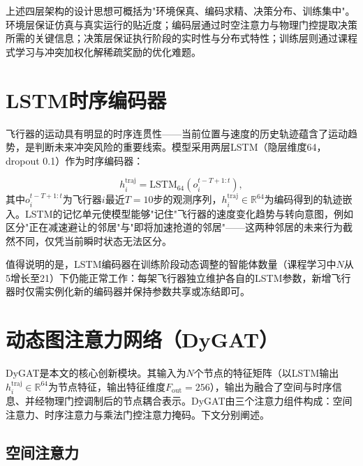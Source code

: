 \documentclass[12pt,a4paper,UTF8]{ctexbook}
\begin{document}
上述四层架构的设计思想可概括为"环境保真、编码求精、决策分布、训练集中"。环境层保证仿真与真实运行的贴近度；编码层通过时空注意力与物理门控提取决策所需的关键信息；决策层保证执行阶段的实时性与分布式特性；训练层则通过课程式学习与冲突加权化解稀疏奖励的优化难题。

\section{LSTM时序编码器}

飞行器的运动具有明显的时序连贯性——当前位置与速度的历史轨迹蕴含了运动趋势，是判断未来冲突风险的重要线索。模型采用两层LSTM（隐层维度64，dropout 0.1）作为时序编码器：

\begin{equation}
    h_i^{\text{traj}} = \text{LSTM}_{64}(o_i^{t-T+1:t}),
    \label{eq:lstm}
\end{equation}
其中$o_i^{t-T+1:t}$为飞行器$i$最近$T=10$步的观测序列，$h_i^{\text{traj}}\in\mathbb{R}^{64}$为编码得到的轨迹嵌入。LSTM的记忆单元使模型能够"记住"飞行器的速度变化趋势与转向意图，例如区分"正在减速避让的邻居"与"即将加速抢道的邻居"——这两种邻居的未来行为截然不同，仅凭当前瞬时状态无法区分。

值得说明的是，LSTM编码器在训练阶段动态调整的智能体数量（课程学习中$N$从5增长至21）下仍能正常工作：每架飞行器独立维护各自的LSTM参数，新增飞行器时仅需实例化新的编码器并保持参数共享或冻结即可。

\section{动态图注意力网络（DyGAT）}

DyGAT是本文的核心创新模块。其输入为$N$个节点的特征矩阵（以LSTM输出$h_i^{\text{traj}}\in\mathbb{R}^{64}$为节点特征，输出特征维度$F_{\text{out}}=256$），输出为融合了空间与时序信息、并经物理门控调制后的节点耦合表示。DyGAT由三个注意力组件构成：空间注意力、时序注意力与乘法门控注意力掩码。下文分别阐述。

\subsection{空间注意力}
\end{document}
